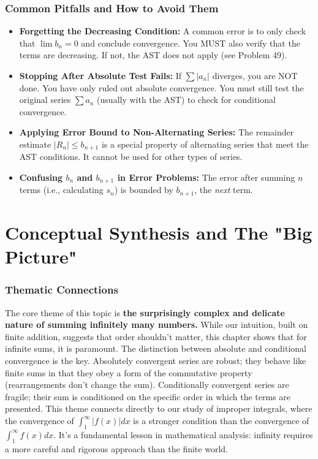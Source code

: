 \documentclass{article}
\begin{document}
\section{Common Pitfalls and How to Avoid Them}
\begin{itemize}
    \item \textbf{Forgetting the Decreasing Condition:} A common error is to only check that $\lim b_n = 0$ and conclude convergence. You MUST also verify that the terms are decreasing. If not, the AST does not apply (see Problem 49).
    \item \textbf{Stopping After Absolute Test Fails:} If $\sum |a_n|$ diverges, you are NOT done. You have only ruled out absolute convergence. You must still test the original series $\sum a_n$ (usually with the AST) to check for conditional convergence.
    \item \textbf{Applying Error Bound to Non-Alternating Series:} The remainder estimate $|R_n| \le b_{n+1}$ is a special property of alternating series that meet the AST conditions. It cannot be used for other types of series.
    \item \textbf{Confusing $b_n$ and $b_{n+1}$ in Error Problems:} The error after summing $n$ terms (i.e., calculating $s_n$) is bounded by $b_{n+1}$, the \textit{next} term.
\end{itemize}

\part{Conceptual Synthesis and The "Big Picture"}

\section{Thematic Connections}
The core theme of this topic is \textbf{the surprisingly complex and delicate nature of summing infinitely many numbers.} While our intuition, built on finite addition, suggests that order shouldn't matter, this chapter shows that for infinite sums, it is paramount. The distinction between absolute and conditional convergence is the key. Absolutely convergent series are robust; they behave like finite sums in that they obey a form of the commutative property (rearrangements don't change the sum). Conditionally convergent series are fragile; their sum is conditioned on the specific order in which the terms are presented. This theme connects directly to our study of improper integrals, where the convergence of $\int_1^\infty |f(x)| dx$ is a stronger condition than the convergence of $\int_1^\infty f(x) dx$. It's a fundamental lesson in mathematical analysis: infinity requires a more careful and rigorous approach than the finite world.
\end{document}
